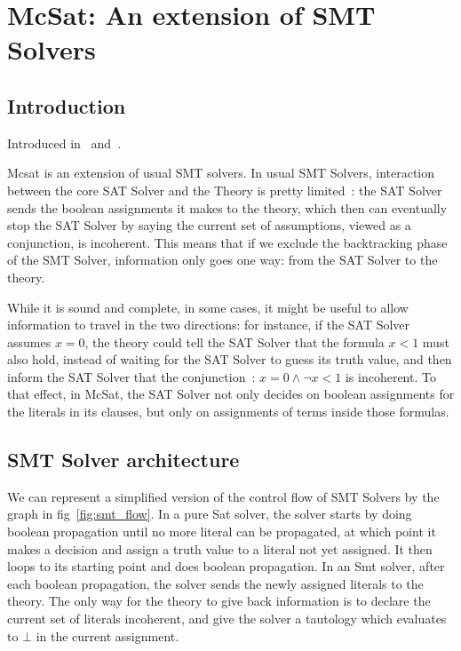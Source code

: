 
\section{McSat: An extension of SMT Solvers}

\subsection{Introduction}

Introduced in~\cite{VMCAI13} and~\cite{FMCAD13}.

Mcsat is an extension of usual SMT solvers. In usual SMT Solvers, interaction between
the core SAT Solver and the Theory is pretty limited~: the SAT Solver sends the boolean
assignments it makes to the theory, which then can eventually stop the SAT Solver by
saying the current set of assumptions, viewed as a conjunction, is incoherent. This means
that if we exclude the backtracking phase of the SMT Solver, information only goes one way:
from the SAT Solver to the theory.

While it is sound and complete, in some cases, it might be useful to allow information to
travel in the two directions: for instance, if the SAT Solver assumes $x = 0$, the theory
could tell the SAT Solver that the formula $x < 1$ must also hold, instead of waiting
for the SAT Solver to guess its truth value, and then inform the SAT Solver that the
conjunction~: $x = 0 \land \neg x < 1$ is incoherent. To that effect, in McSat,
the SAT Solver not only decides on boolean assignments for the literals in its clauses,
but only on assignments of terms inside those formulas.

\subsection{SMT Solver architecture}

We can represent a simplified version of the control flow of SMT Solvers by the
graph in fig~\ref{fig:smt_flow}. In a pure Sat solver, the solver starts by doing
boolean propagation until no more literal can be propagated, at which point it
makes a decision and assign a truth value to a literal not yet assigned. It then
loops to its starting point and does boolean propagation. In an Smt solver,
after each boolean propagation, the solver sends the newly assigned literals
to the theory. The only way for the theory to give back information is to
declare the current set of literals incoherent, and give the solver a tautology
which evaluates to $\bot$ in the current assignment.

